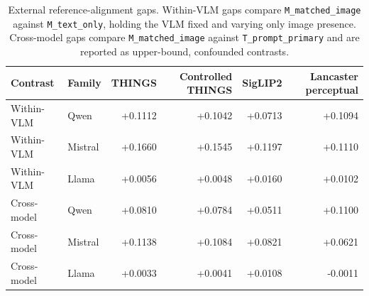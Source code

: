 \documentclass{article}
\begin{document}
\begin{table}[!htbp]
\centering
\caption{External reference-alignment gaps. Within-VLM gaps compare \texttt{M\_matched\_image} against \texttt{M\_text\_only}, holding the VLM fixed and varying only image presence. Cross-model gaps compare \texttt{M\_matched\_image} against \texttt{T\_prompt\_primary} and are reported as upper-bound, confounded contrasts.}
\label{tab:appendix_external_alignment_gaps}
\footnotesize
\begin{tabular}{llrrrr}
\toprule
Contrast & Family & THINGS & Controlled THINGS & SigLIP2 & Lancaster perceptual \\
\midrule
Within-VLM & Qwen & +0.1112 & +0.1042 & +0.0713 & +0.1094 \\
Within-VLM & Mistral & +0.1660 & +0.1545 & +0.1197 & +0.1110 \\
Within-VLM & Llama & +0.0056 & +0.0048 & +0.0160 & +0.0102 \\
\midrule
Cross-model & Qwen & +0.0810 & +0.0784 & +0.0511 & +0.1100 \\
Cross-model & Mistral & +0.1138 & +0.1084 & +0.0821 & +0.0621 \\
Cross-model & Llama & +0.0033 & +0.0041 & +0.0108 & -0.0011 \\
\bottomrule
\end{tabular}
\end{table}
\end{document}
